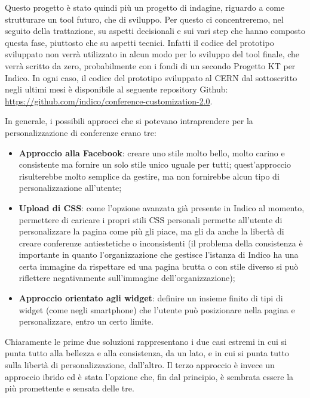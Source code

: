             Questo progetto è stato quindi più un progetto di indagine, riguardo a come strutturare un tool futuro, che di sviluppo. Per questo ci concentreremo, nel seguito della trattazione, su aspetti decisionali e sui vari step che hanno composto questa fase, piuttosto che su aspetti tecnici. Infatti il codice del prototipo sviluppato non verrà utilizzato in alcun modo per lo sviluppo del tool finale, che verrà scritto da zero, probabilmente con i fondi di un secondo Progetto KT per Indico. In ogni caso, il codice del prototipo sviluppato al \ac{CERN} dal sottoscritto negli ultimi mesi è disponibile al seguente repository Github: \url{https://github.com/indico/conference-customization-2.0}.
            
            In generale, i possibili approcci che si potevano intraprendere per la personalizzazione di conferenze erano tre:
            
            \begin{itemize}
                \item \textbf{Approccio alla Facebook}: creare uno stile molto bello, molto carino e consistente ma fornire un solo stile unico uguale per tutti; quest'approccio risulterebbe molto semplice da gestire, ma non fornirebbe alcun tipo di personalizzazione all'utente;
                \item \textbf{Upload di \ac{CSS}}: come l'opzione avanzata già presente in Indico al momento, permettere di caricare i propri stili \ac{CSS} personali permette all'utente di personalizzare la pagina come più gli piace, ma gli da anche la libertà di creare conferenze antiestetiche o inconsistenti (il problema della consistenza è importante in quanto l'organizzazione che gestisce l'istanza di Indico ha una certa immagine da rispettare ed una pagina brutta o con stile diverso si può riflettere negativamente sull'immagine dell'organizzazione);
                \item \textbf{Approccio orientato agli widget}: definire un insieme finito di tipi di widget (come negli smartphone) che l'utente può posizionare nella pagina e personalizzare, entro un certo limite.
            \end{itemize}
            
            Chiaramente le prime due soluzioni rappresentano i due casi estremi in cui si punta tutto alla bellezza e alla consistenza, da un lato, e in cui si punta tutto sulla libertà di personalizzazione, dall'altro. Il terzo approccio è invece un approccio ibrido ed è stata l'opzione che, fin dal principio, è sembrata essere la più promettente e sensata delle tre.
            
